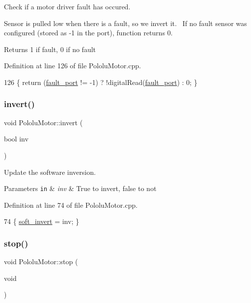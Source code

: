 Check if a motor driver fault has occured. 

Sensor is pulled low when there is a fault, so we invert it.~\newline
 If no fault sensor was configured (stored as -\/1 in the port), function returns 0. \begin{DoxyReturn}{Returns}
1 if fault, 0 if no fault 
\end{DoxyReturn}


Definition at line 126 of file Pololu\+Motor.\+cpp.


\begin{DoxyCode}
126 \{ \textcolor{keywordflow}{return} (\hyperlink{class_pololu_motor_aa1c771561c7c483216aec3415aa6ec9d}{fault\_port} != -1) ? !digitalRead(\hyperlink{class_pololu_motor_aa1c771561c7c483216aec3415aa6ec9d}{fault\_port}) : 0; \}
\end{DoxyCode}
\mbox{\label{class_pololu_motor_a775d61d3b864ba6ffd4fb9195ccb26b3}} 
\subsubsection{\texorpdfstring{invert()}{invert()}}
{\footnotesize\ttfamily void Pololu\+Motor\+::invert (\begin{DoxyParamCaption}\item[{bool}]{inv }\end{DoxyParamCaption})}



Update the software inversion. 


\begin{DoxyParams}[1]{Parameters}
\mbox{\tt in}  & {\em inv} & True to invert, false to not \\
\hline
\end{DoxyParams}


Definition at line 74 of file Pololu\+Motor.\+cpp.


\begin{DoxyCode}
74 \{ \hyperlink{class_pololu_motor_af729e682597489cad35fd8a109ab9e5f}{soft\_invert} = inv; \}
\end{DoxyCode}
\mbox{\label{class_pololu_motor_a57c4465fe5791b4a57c42fcca3579ea4}} 
\subsubsection{\texorpdfstring{stop()}{stop()}}
{\footnotesize\ttfamily void Pololu\+Motor\+::stop (\begin{DoxyParamCaption}\item[{void}]{ }\end{DoxyParamCaption})}



